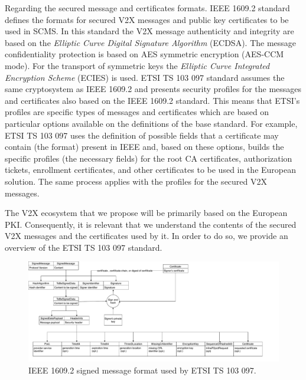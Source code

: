 Regarding the secured message and certificates formats. IEEE 1609.2 \cite{iee_formats} standard defines the formats for secured V2X messages and public key certificates to be used in SCMS. In this standard the V2X message authenticity and integrity are based on the \textit{Elliptic Curve Digital Signature Algorithm} (ECDSA). The message confidentiality protection is based on AES symmetric encryption (AES-CCM mode). For the transport of symmetric keys the \textit{Elliptic Curve Integrated Encryption Scheme} (ECIES) is used. ETSI TS 103 097 standard \cite{etsi_formats} assumes the same cryptosystem as IEEE 1609.2 and presents security profiles for the messages and certificates also based on the IEEE 1609.2 standard. This means that ETSI's profiles are specific types of messages and certificates which are based on particular options available on the definitions of the base standard. For example, ETSI TS 103 097 uses the definition of possible fields that a certificate may contain (the format) present in IEEE and, based on these options, builds the specific profiles (the necessary fields) for the root CA certificates, authorization tickets, enrollment certificates, and other certificates to be used in the European solution. The same process applies with the profiles for the secured V2X messages. 

The V2X ecosystem that we propose will be primarily based on the European PKI. Consequently, it is relevant that we understand the contents of the secured V2X messages and the certificates used by it. In order to do so, we provide an overview of the ETSI TS 103 097 standard. 

\begin{figure}
	\centering
	\includegraphics[width=1.1\textwidth]{Figures/message_format.pdf}
	\caption{\label{fig:signed_message}IEEE 1609.2 signed message format used by ETSI TS 103 097.}
\end{figure}

